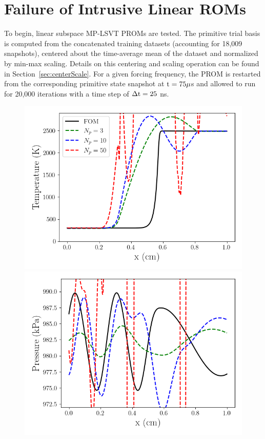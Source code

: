 \section{Failure of Intrusive Linear ROMs}

To begin, linear subspace MP-LSVT PROMs are tested. The primitive trial basis is computed from the concatenated training datasets (accounting for 18,009 snapshots), centered about the time-average mean of the dataset and normalized by min-max scaling. Details on this centering and scaling operation can be found in Section~\ref{sec:centerScale}. For a given forcing frequency, the PROM is restarted from the corresponding primitive state snapshot at $\text{t} = 75 \mu$s and allowed to run for 20,000 iterations with a time step of $\Delta \text{t} = 25$ ns.

\begin{figure}
    \begin{minipage}{0.49\linewidth}
        \includegraphics[width=0.99\linewidth]{Chapters/TransientFlame/Images/linear/rom_temp_snaps.png}
    \end{minipage}
    \begin{minipage}{0.49\linewidth}
        \includegraphics[width=0.99\linewidth]{Chapters/TransientFlame/Images/linear/rom_press_snaps.png}

\end{minipage}
\end{figure}
